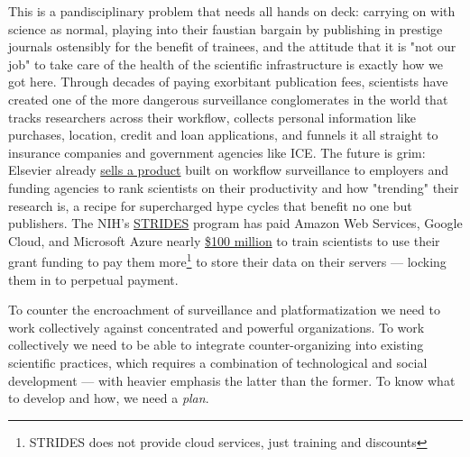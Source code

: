 This is a pandisciplinary problem that needs all hands on deck: carrying on with science as normal, playing into their faustian bargain by publishing in prestige journals ostensibly for the benefit of trainees, and the attitude that it is "not our job" to take care of the health of the scientific infrastructure is exactly how we got here. Through decades of paying exorbitant publication fees, scientists have created one of the more dangerous surveillance conglomerates in the world that tracks researchers across their workflow, collects personal information like purchases, location, credit and loan applications, and funnels it all straight to insurance companies and government agencies like ICE\cite{biddleLexisNexisProvideGiant2021}. The future is grim: Elsevier already \href{https://www.scival.com/landing}{sells a product} built on workflow surveillance to employers and funding agencies to rank scientists on their productivity and how "trending" their research is, a recipe for supercharged hype cycles that benefit no one but publishers. The NIH's \href{https://datascience.nih.gov/strides/}{STRIDES} program has paid Amazon Web Services, Google Cloud, and Microsoft Azure nearly \href{https://reporter.nih.gov/search/TUZ2dhR4OEyc2XbE5FSW8g/projects}{\$100 million} to train scientists to use their grant funding to pay them more\footnote{STRIDES does not provide cloud services, just training and discounts} to store their data on their servers --- locking them in to perpetual payment.

To counter the encroachment of surveillance and platformatization we need to work collectively against concentrated and powerful organizations. To work collectively we need to be able to integrate counter-organizing into existing scientific practices, which requires a combination of technological and social development --- with heavier emphasis the latter than the former. To know what to develop and how, we need a \textit{plan}.

